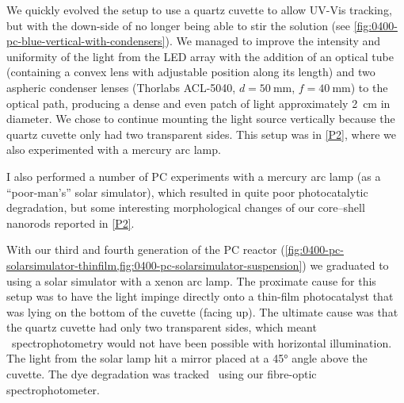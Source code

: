 \documentclass[webedition,openright,titles,swedish,english]{LuaUUThesis}\usepackage[]{graphicx}\usepackage[]{xcolor}
\begin{document}
We quickly evolved the setup to use a quartz cuvette to allow \insitu{} \gls{UV-Vis} tracking,
but with the down-side of no longer being able to stir the solution
(see \cref{fig:0400-pc-blue-vertical-with-condensers}).
We managed to improve the intensity and uniformity of the light from
the \gls{LED} array with the addition of an optical tube (containing a convex lens
with adjustable position along its length) and two aspheric condenser lenses
(Thorlabs ACL-5040, $d=\qty{50}{\mm}$, $f=\qty{40}{\mm}$) to the optical path,
producing a dense and even patch of light approximately \qty{2}{\cm} in diameter.
We chose to continue mounting the light source vertically because the quartz cuvette
only had two transparent sides.
This setup was in \cref{P2}, where we also experimented with a mercury arc lamp.

I also performed a number of \gls{PC} experiments with a mercury arc lamp
(as a \enquote{poor-man's} solar simulator), which resulted in quite
poor photocatalytic degradation, but some interesting morphological
changes of our core--shell nanorods reported in \cref{P2}.

With our third and fourth generation of the \gls{PC} reactor
(\cref{fig:0400-pc-solarsimulator-thinfilm,fig:0400-pc-solarsimulator-suspension})
we graduated to using a solar simulator with a xenon arc lamp.
The proximate cause for this setup was to have the light impinge directly onto a
thin-film photocatalyst that was lying on the bottom of the cuvette (facing up).
The ultimate cause was that the quartz cuvette had only two transparent sides,
which meant \insitu\ spectrophotometry would not have been possible with horizontal illumination.
The light from the solar lamp hit a mirror placed at a \ang{45} angle above the cuvette.
The dye degradation was tracked \insitu\ using our fibre-optic spectrophotometer.

%
\end{document}
